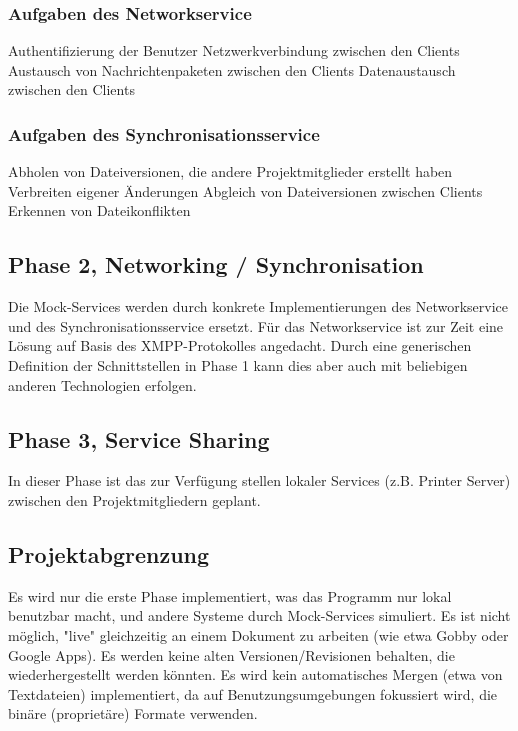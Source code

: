\subsubsection{Aufgaben des Networkservice}
Authentifizierung der Benutzer
Netzwerkverbindung zwischen den Clients
Austausch von Nachrichtenpaketen zwischen den Clients
Datenaustausch zwischen den Clients

\subsubsection{Aufgaben des Synchronisationsservice}
Abholen von Dateiversionen, die andere Projektmitglieder erstellt haben
Verbreiten eigener Änderungen
Abgleich von Dateiversionen zwischen Clients
Erkennen von Dateikonflikten
\subsection{Phase 2, Networking / Synchronisation}
Die Mock-Services werden durch konkrete  Implementierungen des Networkservice und des Synchronisationsservice ersetzt. Für das Networkservice ist zur Zeit eine Lösung auf Basis des XMPP-Protokolles angedacht. Durch eine generischen Definition der Schnittstellen in Phase 1 kann dies aber auch mit beliebigen anderen Technologien erfolgen.
\subsection{Phase 3, Service Sharing}
In dieser Phase ist das zur Verfügung stellen lokaler Services (z.B. Printer Server) zwischen den Projektmitgliedern geplant.

\subsection{Projektabgrenzung}
Es wird nur die erste Phase implementiert, was das Programm nur lokal benutzbar macht, und andere Systeme durch Mock-Services simuliert. 
Es ist nicht möglich, "live" gleichzeitig an einem Dokument zu arbeiten (wie etwa Gobby oder Google Apps).
Es werden keine alten Versionen/Revisionen behalten, die wiederhergestellt werden könnten.
Es wird kein automatisches Mergen (etwa von Textdateien) implementiert, da auf Benutzungsumgebungen fokussiert wird, die binäre (proprietäre) Formate verwenden.




